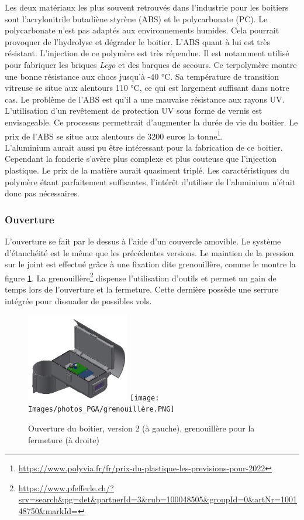 Les deux matériaux les plus souvent retrouvés dans l’industrie pour les boitiers sont l’acrylonitrile 
butadiène styrène (ABS) et le polycarbonate (PC). Le polycarbonate n'est pas adaptés aux 
environnements humides. Cela pourrait provoquer de l’hydrolyse et dégrader le boitier. 
L’ABS quant à lui est très résistant.
L’injection de ce polymère est très répendue. Il est notamment utilisé pour fabriquer les briques \emph{Lego}
et des barques de secours. 
Ce terpolymère montre une bonne résistance aux chocs jusqu'à -40 °C. Sa température de transition vitreuse se 
situe aux alentours 110 °C, ce qui est largement suffisant dans notre cas. Le problème de l’ABS est qu’il a une mauvaise 
résistance aux rayons UV. L’utilisation d’un revêtement de protection UV sous forme de vernis est envisageable. 
Ce processus permettrait d’augmenter la durée de vie du boitier. Le prix de l’ABS se situe aux alentours 
de 3200 euros la tonne\footnote{\url{https://www.polyvia.fr/fr/prix-du-plastique-les-previsions-pour-2022}}.\\
L’aluminium aurait aussi pu être intéressant pour la fabrication de ce boitier. Cependant la fonderie 
s’avère plus complexe et plus couteuse que l’injection plastique. Le prix de la matière aurait quasiment 
triplé. Les caractéristiques du polymère étant parfaitement suffisantes, l’intérêt d’utiliser de l’aluminium 
n’était donc pas nécessaires.

\subsubsection{Ouverture}

L’ouverture se fait par le dessus à l’aide d’un couvercle amovible. Le système d’étanchéité est le 
même que les précédentes versions. Le maintien de la pression sur le joint est effectué grâce à 
une fixation dite grenouillère, comme le montre la figure \ref{fig:ouverturev2}. 
La grenouillère\footnote{\url{https://www.pfefferle.ch/?srv=search&pg=det&partnerId=3&rub=100048505&groupId=0&artNr=100148750&markId=}} 
dispense l’utilisation d’outils et permet un gain de temps lors de l’ouverture et la fermeture. 
Cette dernière possède une serrure intégrée pour dissuader de possibles vols.

\begin{figure}[H]
    \centering
    \includegraphics[width=0.4\textwidth]{Images/photos_PGA/Boitierv41.PNG}
    \texttt{[image: Images/photos\_PGA/grenouillère.PNG]}
    \caption{Ouverture du boitier, version 2 (à gauche), grenouillère pour la fermeture (à droite)}
    \label{fig:ouverturev2}
\end{figure}

